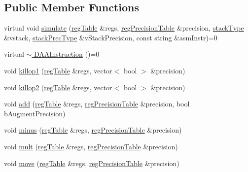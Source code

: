 \subsection*{Public Member Functions}
\begin{DoxyCompactItemize}
\item 
virtual void \hyperlink{classDAAInstruction_a61d0b9bece1e0ead89a46c0197276324}{simulate} (\hyperlink{DAAInstruction_8h_af0fae93a861de9cf37988d5673cac523}{reg\+Table} \&regs, \hyperlink{DAAInstruction_8h_a0e8cae02815a5f8adc750122d790b455}{reg\+Precision\+Table} \&precision, \hyperlink{DAAInstruction_8h_a1b0e70ac1a04f06c8132055ed01f589f}{stack\+Type} \&vstack, \hyperlink{DAAInstruction_8h_ac5cb793e9dac3fa9693da78b7e29ab30}{stack\+Prec\+Type} \&v\+Stack\+Precision, const string \&asm\+Instr)=0
\item 
virtual \hyperlink{classDAAInstruction_a6db9518dfdbe63ad9853c980244e8cd7}{$\sim$ D\+A\+A\+Instruction} ()=0
\item 
void \hyperlink{classDAAInstruction_a5777e370fcddd3fcee56292a0b11ce76}{killop1} (\hyperlink{DAAInstruction_8h_af0fae93a861de9cf37988d5673cac523}{reg\+Table} \&regs, vector$<$ bool $>$ \&precision)
\item 
void \hyperlink{classDAAInstruction_af578262b493bcef395ca2a3013dc8f0c}{killop2} (\hyperlink{DAAInstruction_8h_af0fae93a861de9cf37988d5673cac523}{reg\+Table} \&regs, vector$<$ bool $>$ \&precision)
\item 
void \hyperlink{classDAAInstruction_aa83f60d8f5ffdce5192c9699df67afbb}{add} (\hyperlink{DAAInstruction_8h_af0fae93a861de9cf37988d5673cac523}{reg\+Table} \&regs, \hyperlink{DAAInstruction_8h_a0e8cae02815a5f8adc750122d790b455}{reg\+Precision\+Table} \&precision, bool b\+Augment\+Precision)
\item 
void \hyperlink{classDAAInstruction_ad2828825e913269a17a24391bab25bfe}{minus} (\hyperlink{DAAInstruction_8h_af0fae93a861de9cf37988d5673cac523}{reg\+Table} \&regs, \hyperlink{DAAInstruction_8h_a0e8cae02815a5f8adc750122d790b455}{reg\+Precision\+Table} \&precision)
\item 
void \hyperlink{classDAAInstruction_afa5c8e1e48253021eb5517084c90e9a3}{mult} (\hyperlink{DAAInstruction_8h_af0fae93a861de9cf37988d5673cac523}{reg\+Table} \&regs, \hyperlink{DAAInstruction_8h_a0e8cae02815a5f8adc750122d790b455}{reg\+Precision\+Table} \&precision)
\item 
void \hyperlink{classDAAInstruction_a6288019f03a686afb96918bf43573fc3}{move} (\hyperlink{DAAInstruction_8h_af0fae93a861de9cf37988d5673cac523}{reg\+Table} \&regs, \hyperlink{DAAInstruction_8h_a0e8cae02815a5f8adc750122d790b455}{reg\+Precision\+Table} \&precision)

\end{DoxyCompactItemize}
